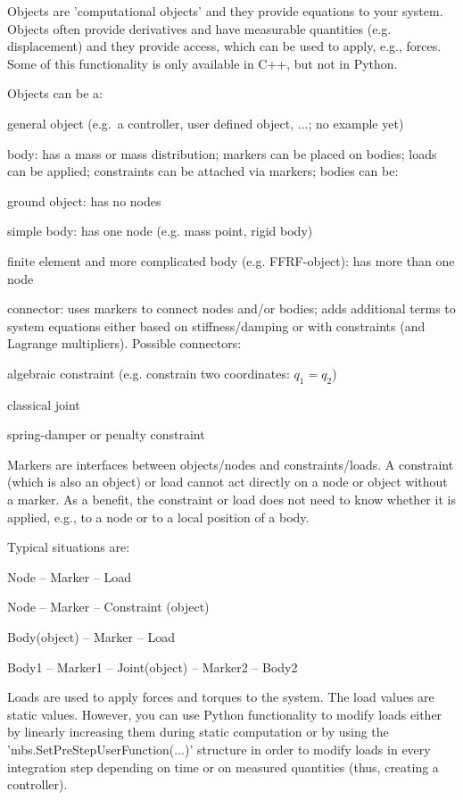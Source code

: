 Objects are 'computational objects' and they provide equations to your system. Objects often provide derivatives and have measurable quantities (e.g. displacement) and they provide access, which can be used to apply, e.g., forces. Some of this functionality is only available in C++, but not in Python.

Objects can be a:
\bi
  \item general object (e.g.\ a controller, user defined object, ...; no example yet)
  \item body: has a mass or mass distribution; markers can be placed on bodies; loads can be applied; constraints can be attached via markers; bodies can be:
  \bi
    \item[--] ground object: has no nodes
    \item[--] simple body: has one node (e.g. mass point, rigid body)
    \item[--] finite element and more complicated body (e.g. FFRF-object): has more than one node
  \ei
  \item connector: uses markers to connect nodes and/or bodies; adds additional terms to system equations either based on stiffness/damping or with constraints (and Lagrange multipliers). Possible connectors:
  \bi
    \item[--] algebraic constraint (e.g. constrain two coordinates: $q_1 = q_2$)
    \item[--] classical joint
    \item[--] spring-damper or penalty constraint
  \ei
\ei

Markers are interfaces between objects/nodes and constraints/loads.
A constraint (which is also an object) or load cannot act directly on a node or object without a marker.
As a benefit, the constraint or load does not need to know whether it is applied, e.g., to a node or to a local position of a body.

Typical situations are:
\bi
  \item Node -- Marker -- Load
  \item Node -- Marker -- Constraint (object)
  \item Body(object) -- Marker -- Load
  \item Body1 -- Marker1 -- Joint(object) -- Marker2 -- Body2
\ei

Loads are used to apply forces and torques to the system. The load values are static values. However, you can use Python functionality to modify loads either by linearly increasing them during static computation or by using the 'mbs.SetPreStepUserFunction(...)' structure in order to modify loads in every integration step depending on time or on measured quantities (thus, creating a controller).

